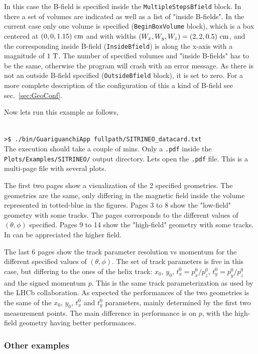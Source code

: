 In this case the B-field is specified inside the {\tt MultipleStepsBfield} block. In there a set of volumes are indicated as well as a list of "inside B-fields". 
In the current case only one volume is specified ({\tt BeginBoxVolume} block), which is a box centered at $(0,0,1.15)~{\rm cm}$ and with widths 
$(W_x,W_y,W_z) = (2,2,0.5)~{\rm cm}$, and the corresponding inside B-field ({\tt InsideBfield}) is along the x-axis with a magnitude of $1~{\rm T}$. 
The number of specified volumes and "inside B-fields" has to be the same, otherwise the program will crash with an error message. As there is not an outside 
B-field specified ({\tt OutsideBfield} block), it is set to zero. For a more complete description of the configuration of this a kind of B-field 
see sec.~\ref{sec:GeoConf}.


\noindent
Now lets run this example as follows,

~\\
\noindent
{\tt >\$ ./bin/GuariguanchiApp  fullpath/SITRINEO\_datacard.txt}
~\\

\noindent
The execution should take a couple of mins. Only a {\tt .pdf} inside the {\tt Plots/Examples/SITRINEO/} output directory. 
Lets open the {\tt .pdf} file. This is a multi-page file with several plots.

The first two pages show a visualization of the 2 specified geometries. The geometries are the same, only differing in the magnetic field 
inside the volume represented in totted-blue in the figures. Pages 3 to 8 show the "low-field" geometry with some tracks. The pages corresponds 
to the different values of $(\theta,\phi)$ specified. Pages 9 to 14 show the "high-field" geometry with some tracks. In can be appreciated the 
higher field.

The last 6 pages show the track parameter resolution vs momentum for the different specified values of $(\theta,\phi)$. The set of track 
parameters is five in this case, but differing to the ones of the helix track: $x_0$, $y_0$, $t^0_x = p^0_x/p^0_z$, $t^0_y = p^0_y/p^0_z$
and the signed momentum $p$. This is the same track parameterization as used by the LHCb collaboration. As expected the performances of the 
two geometries is the same of the $x_0$, $y_0$, $t^0_x$ and $t^0_y$ parameters, mainly determined by the first two measurement points. The 
main difference in performance is on $p$, with the high-field geometry having better performances.

\subsubsection{Other examples}
\label{subsubsec:Other_examples}


